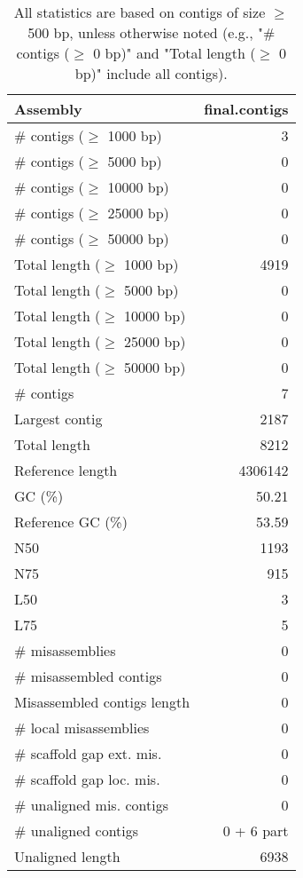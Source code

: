 \documentclass[12pt,a4paper]{article}
\begin{document}
\begin{table}[ht]
\begin{center}
\caption{All statistics are based on contigs of size $\geq$ 500 bp, unless otherwise noted (e.g., "\# contigs ($\geq$ 0 bp)" and "Total length ($\geq$ 0 bp)" include all contigs).}
\begin{tabular}{|l*{1}{|r}|}
\hline
Assembly & final.contigs \\ \hline
\# contigs ($\geq$ 1000 bp) & 3 \\ \hline
\# contigs ($\geq$ 5000 bp) & 0 \\ \hline
\# contigs ($\geq$ 10000 bp) & 0 \\ \hline
\# contigs ($\geq$ 25000 bp) & 0 \\ \hline
\# contigs ($\geq$ 50000 bp) & 0 \\ \hline
Total length ($\geq$ 1000 bp) & 4919 \\ \hline
Total length ($\geq$ 5000 bp) & 0 \\ \hline
Total length ($\geq$ 10000 bp) & 0 \\ \hline
Total length ($\geq$ 25000 bp) & 0 \\ \hline
Total length ($\geq$ 50000 bp) & 0 \\ \hline
\# contigs & 7 \\ \hline
Largest contig & 2187 \\ \hline
Total length & 8212 \\ \hline
Reference length & 4306142 \\ \hline
GC (\%) & 50.21 \\ \hline
Reference GC (\%) & 53.59 \\ \hline
N50 & 1193 \\ \hline
N75 & 915 \\ \hline
L50 & 3 \\ \hline
L75 & 5 \\ \hline
\# misassemblies & 0 \\ \hline
\# misassembled contigs & 0 \\ \hline
Misassembled contigs length & 0 \\ \hline
\# local misassemblies & 0 \\ \hline
\# scaffold gap ext. mis. & 0 \\ \hline
\# scaffold gap loc. mis. & 0 \\ \hline
\# unaligned mis. contigs & 0 \\ \hline
\# unaligned contigs & 0 + 6 part \\ \hline
Unaligned length & 6938 \\ \hline

\end{tabular}
\end{center}
\end{table}
\end{document}
